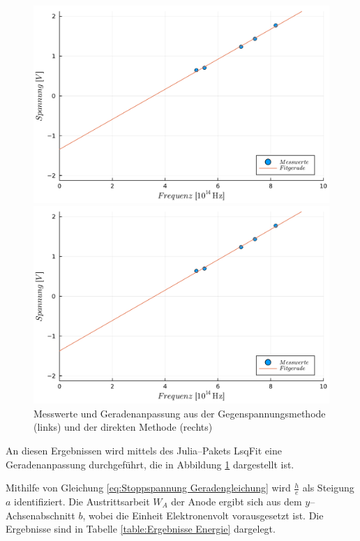 \documentclass[12pt,a4paper]{scrartcl}
\numberwithin{equation}{section} %
\newcommand{\code}[1]{\textsf{#1}}
\begin{document}
\begin{figure}[h!]
	\begin{minipage}{0.5\textwidth}
		\includegraphics[width=\linewidth]{../media/B1.4/gegenPlot.pdf}
	\end{minipage}
	\begin{minipage}{0.5\textwidth}
		\includegraphics[width=\linewidth]{../media/B1.4/direktPlot.pdf}
	\end{minipage}
	\caption{Messwerte und Geradenanpassung aus der Gegenspannungsmethode (links) und der direkten Methode (rechts)}
	\label{fig:fitGeraden}
\end{figure}

\noindent
An diesen Ergebnissen wird mittels des \code{Julia}--Pakets \code{LsqFit} \cite{Julia:LsqFit} eine Geradenanpassung durchgeführt, die in Abbildung \ref{fig:fitGeraden} dargestellt ist.

Mithilfe von Gleichung \eqref{eq:Stoppspannung Geradengleichung} wird $\frac{h}{e}$ als Steigung $a$ identifiziert. Die Austrittsarbeit $W_A$ der Anode ergibt sich aus dem $y$--Achsenabschnitt $b$, wobei die Einheit Elektronenvolt vorausgesetzt ist. Die Ergebnisse sind in Tabelle \ref{table:Ergebnisse Energie} dargelegt.
\end{document}
